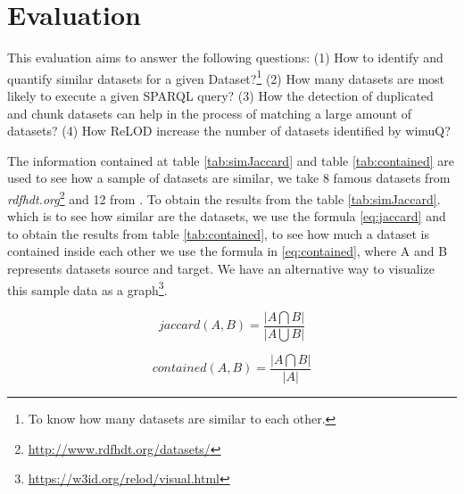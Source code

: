 \section{Evaluation}
\label{sec:eval}
This evaluation aims to answer the following questions: (1) How to identify and quantify similar datasets for a given Dataset?\footnote{To know how many datasets are similar to each other.} (2) How many datasets are most likely to execute a given SPARQL query? (3) How the detection of duplicated and chunk datasets can help in the process of matching a large amount of datasets? (4) How ReLOD increase the number of datasets identified by wimuQ?

The information contained at table \ref{tab:simJaccard} and table \ref{tab:contained} are used to see how a sample of datasets are similar, we take 8 famous datasets from \textit{rdfhdt.org}\footnote{\url{http://www.rdfhdt.org/datasets/}} and 12 from \cite{10.1145/3308560.3317075}. To obtain the results from the table \ref{tab:simJaccard}. which is to see how similar are the datasets, we use the formula \cref{eq:jaccard} and to obtain the results from table \ref{tab:contained}, to see how much a dataset is contained inside each other we use the formula in \cref{eq:contained}, where A and B represents datasets source and target. We have an alternative way to visualize this sample data as a graph\footnote{\url{https://w3id.org/relod/visual.html}}.

\begin{equation} \label{eq:jaccard}
    jaccard(A, B) = \frac{|A \bigcap B|}{ |A\bigcup B|}
\end{equation}

\begin{equation}\label{eq:contained}
    contained(A, B) = \frac{|A \bigcap B|}{|A|}
\end{equation}

